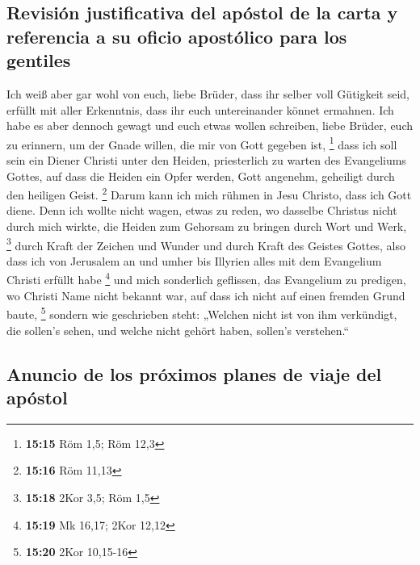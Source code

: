 \hypertarget{revisiuxf3n-justificativa-del-apuxf3stol-de-la-carta-y-referencia-a-su-oficio-apostuxf3lico-para-los-gentiles}{%
\subsection{Revisión justificativa del apóstol de la carta y referencia
a su oficio apostólico para los
gentiles}\label{revisiuxf3n-justificativa-del-apuxf3stol-de-la-carta-y-referencia-a-su-oficio-apostuxf3lico-para-los-gentiles}}

 Ich weiß aber gar wohl von euch, liebe Brüder, dass ihr
selber voll Gütigkeit seid, erfüllt mit aller Erkenntnis, dass ihr euch
untereinander könnet ermahnen.  Ich habe es aber dennoch
gewagt und euch etwas wollen schreiben, liebe Brüder, euch zu erinnern,
um der Gnade willen, die mir von Gott gegeben ist, \footnote{\textbf{15:15}
  Röm 1,5; Röm 12,3}  dass ich soll sein ein Diener
Christi unter den Heiden, priesterlich zu warten des Evangeliums Gottes,
auf dass die Heiden ein Opfer werden, Gott angenehm, geheiligt durch den
heiligen Geist. \footnote{\textbf{15:16} Röm 11,13} 
Darum kann ich mich rühmen in Jesu Christo, dass ich Gott diene.
 Denn ich wollte nicht wagen, etwas zu reden, wo dasselbe
Christus nicht durch mich wirkte, die Heiden zum Gehorsam zu bringen
durch Wort und Werk, \footnote{\textbf{15:18} 2Kor 3,5; Röm 1,5}
 durch Kraft der Zeichen und Wunder und durch Kraft des
Geistes Gottes, also dass ich von Jerusalem an und umher bis Illyrien
alles mit dem Evangelium Christi erfüllt habe \footnote{\textbf{15:19}
  Mk 16,17; 2Kor 12,12}  und mich sonderlich geflissen,
das Evangelium zu predigen, wo Christi Name nicht bekannt war, auf dass
ich nicht auf einen fremden Grund baute, \footnote{\textbf{15:20} 2Kor
  10,15-16}  sondern wie geschrieben steht: „Welchen
nicht ist von ihm verkündigt, die sollen's sehen, und welche nicht
gehört haben, sollen's verstehen.``

\hypertarget{anuncio-de-los-pruxf3ximos-planes-de-viaje-del-apuxf3stol}{%
\subsection{Anuncio de los próximos planes de viaje del
apóstol}\label{anuncio-de-los-pruxf3ximos-planes-de-viaje-del-apuxf3stol}}

